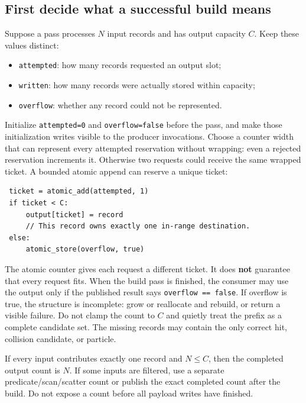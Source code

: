 \subsection{First decide what a successful build means}\label{03-visual-computing-i-ch016-first-decide-what-a-successful-build-means}

Suppose a pass processes \(N\) input records and has output capacity \(C\). Keep these values distinct:

\begin{itemize}
\tightlist
\item
  \texttt{attempted}: how many records requested an output slot;
\item
  \texttt{written}: how many records were actually stored within capacity;
\item
  \texttt{overflow}: whether any record could not be represented.
\end{itemize}

Initialize \texttt{attempted=0} and \texttt{overflow=false} before the pass, and make those initialization writes visible to the producer invocations. Choose a counter width that can represent every attempted reservation without wrapping: even a rejected reservation increments it. Otherwise two requests could receive the same wrapped ticket. A bounded atomic append can reserve a unique ticket:

\begin{verbatim}
 ticket = atomic_add(attempted, 1)
 if ticket < C:
     output[ticket] = record
     // This record owns exactly one in-range destination.
 else:
     atomic_store(overflow, true)
\end{verbatim}

The atomic counter gives each request a different ticket. It does \textbf{not} guarantee that every request fits. When the build pass is finished, the consumer may use the output only if the published result says \texttt{overflow\ ==\ false}. If overflow is true, the structure is incomplete: grow or reallocate and rebuild, or return a visible failure. Do not clamp the count to \(C\) and quietly treat the prefix as a complete candidate set. The missing records may contain the only correct hit, collision candidate, or particle.

If every input contributes exactly one record and \(N\le C\), then the completed output count is \(N\). If some inputs are filtered, use a separate predicate/scan/scatter count or publish the exact completed count after the build. Do not expose a count before all payload writes have finished.

